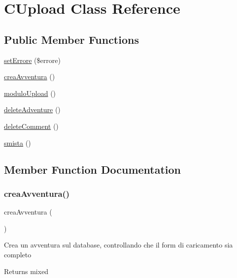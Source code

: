 \hypertarget{class_c_upload}{}\section{C\+Upload Class Reference}
\label{class_c_upload}
\subsection*{Public Member Functions}
\begin{DoxyCompactItemize}
\item 
\mbox{\hyperlink{class_c_upload_a9c4c3362aa5a2db624792c7cf90711e2}{set\+Errore}} (\$errore)
\item 
\mbox{\hyperlink{class_c_upload_aed24a45bfa7cb052dcf6a1ee6bff7c3d}{crea\+Avventura}} ()
\item 
\mbox{\hyperlink{class_c_upload_af458f67cbfe0c2bc648f0bf32bd3c970}{modulo\+Upload}} ()
\item 
\mbox{\hyperlink{class_c_upload_a2ad687d2d6562daadeb49feb4c726bee}{delete\+Adventure}} ()
\item 
\mbox{\hyperlink{class_c_upload_adbd11f5b7c6e8d9e5d1c6f35540f4e4c}{delete\+Comment}} ()
\item 
\mbox{\hyperlink{class_c_upload_afc7ba180569cef3535974cfc4a1211f1}{smista}} ()
\end{DoxyCompactItemize}


\subsection{Member Function Documentation}
\mbox{\label{class_c_upload_aed24a45bfa7cb052dcf6a1ee6bff7c3d}} 
\subsubsection{\texorpdfstring{crea\+Avventura()}{creaAvventura()}}
{\footnotesize\ttfamily crea\+Avventura (\begin{DoxyParamCaption}{ }\end{DoxyParamCaption})}

Crea un avventura sul database, controllando che il form di caricamento sia completo

\begin{DoxyReturn}{Returns}
mixed 
\end{DoxyReturn}
\mbox{\label{class_c_upload_a2ad687d2d6562daadeb49feb4c726bee}} 
